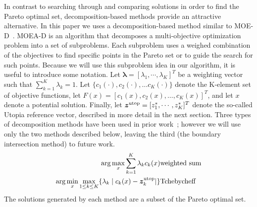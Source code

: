 \documentclass{article}
\begin{document}
In contrast to searching through and comparing solutions in order to find the Pareto optimal set, decomposition-based methods provide an attractive alternative.  
In this paper we uses a decomposition-based method similar to MOE-D~\cite{4358754}.  
MOEA-D is an algorithm that decomposes a multi-objective optimization problem into a set of subproblems.  
Each subproblem uses a weighed combination of the objectives to find specific points in the Pareto set or to guide the search for such points.  
Because we  will use this subproblem idea in our algorithm, it is useful to introduce some notation.
Let $ \bm{\lambda} = [ \lambda_{1} , \cdots , \lambda_{K}  ]^{T} $ be a weighting vector such that $ \sum_{k=1}^{K} \lambda_{k} = 1 $.  Let $\{c_{1}(\cdot), c_{2}(\cdot), \ldots c_{K}(\cdot)\}$ denote the K-element set of objective functions, let $F(x) = [c_{1}(x), c_{2}(x), \ldots, c_{K}(x)]^T$, and let $x$ denote a potential solution.  Finally, let $ \bm{z}^{\rm utop} = [z^{*}_{1}, \cdots , z^{*}_{K}]^{T} $ denote the so-called Utopia reference vector, described in more detail in the next section. 
Three types of decomposition methods have been used in prior work~\cite{4358754}; however we will use only the two methods described below, leaving the third (the boundary intersection method) to future work.
\begin{eqnarray}
 \arg\max_x \sum_{k=1}^{K} \lambda_{k} c_{k} (x) & {\rm weighted \ sum} \label{eq:weighted}\\
 \arg\min_x\max_{1 \leq k \leq K}  \{ \lambda_{k} \mid c_{k}(x) - \bm{z}^{\rm utop}_{k}  | \} & {\rm Tchebycheff} \label{eq:Tchebycheff}%
\end{eqnarray}
The solutions generated by each method are a subset of the Pareto optimal set.
\end{document}
